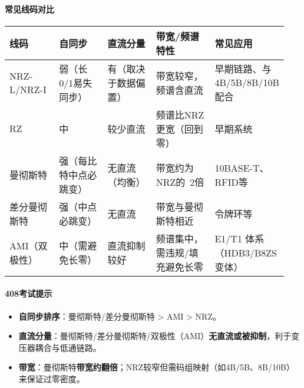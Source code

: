 \documentclass[lang=cn,newtx,10pt,scheme=chinese]{../../elegantbook}
\begin{document}
\begin{center}
{}%
\end{center}

\paragraph{常见线码对比}
{\small\begin{longtable}{|p{0.18\linewidth}|p{0.18\linewidth}|p{0.18\linewidth}|p{0.22\linewidth}|p{0.18\linewidth}|}
\hline
    	\textbf{线码} & \textbf{自同步} & \textbf{直流分量} & \textbf{带宽/频谱特性} & \textbf{常见应用} \\
\hline
NRZ-L/NRZ-I & 弱（长0/1易失同步） & 有（取决于数据偏置） & 带宽较窄，频谱含直流 & 早期链路、与4B/5B/8B/10B配合 \\
\hline
RZ & 中 & 较少直流 & 频谱比NRZ更宽（回到零） & 早期系统 \\
\hline
曼彻斯特 & 强（每比特中点必跳变） & 无直流（均衡） & 带宽约为NRZ的~2倍 & 10BASE-T、RFID等 \\
\hline
差分曼彻斯特 & 强（中点必跳变） & 无直流 & 带宽与曼彻斯特相近 & 令牌环等 \\
\hline
AMI（双极性） & 中（需避免长零） & 直流抑制较好 & 频谱集中，需违规/填充避免长零 & E1/T1 体系（HDB3/B8ZS变体） \\
\hline
\end{longtable}}

\paragraph{408考试提示}
\begin{itemize}
    \item \textbf{自同步排序}：曼彻斯特/差分曼彻斯特 \textgreater{} AMI \textgreater{} NRZ。
    \item \textbf{直流分量}：曼彻斯特/差分曼彻斯特/双极性（AMI）\textbf{无直流或被抑制}，利于变压器耦合与低通链路。
    \item \textbf{带宽}：曼彻斯特\textbf{带宽约翻倍}；NRZ较窄但需码组映射（如4B/5B、8B/10B）来保证过零密度。
\end{itemize}
\end{document}
